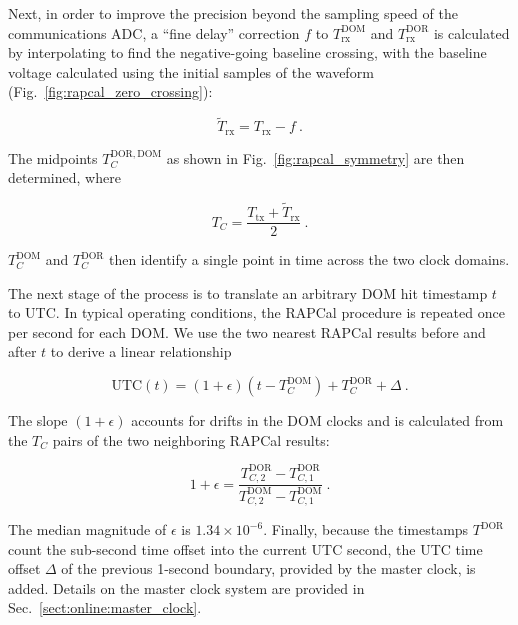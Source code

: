 Next, in order to improve the precision beyond the sampling speed of the
communications ADC, a ``fine delay'' correction $f$ to $T_{\mathrm{rx}}^{\mathrm{DOM}}$ and
$T_{\mathrm{rx}}^{\mathrm{DOR}}$ is calculated by interpolating 
to find the negative-going baseline crossing, with the baseline voltage
calculated using the initial samples of the waveform (Fig.~\ref{fig:rapcal_zero_crossing}):

\begin{equation}
  \tilde{T}_{\mathrm{rx}} = T_{\mathrm{rx}} - f\ .
\end{equation}


\noindent The midpoints $T_C^{\mathrm{DOR,DOM}}$ as shown in
Fig.~\ref{fig:rapcal_symmetry} are then determined, where

\begin{equation}
  T_C =  \frac{T_{\mathrm{tx}} + \tilde{T}_{\mathrm{rx}}}{2}\ .
\end{equation}

\noindent $T_C^{\mathrm{DOM}}$ and $T_C^{\mathrm{DOR}}$ then identify a
single point in time across the two clock domains.

The next stage of the process is to translate an arbitrary DOM hit timestamp
$t$ to UTC.  In typical operating conditions, the RAPCal procedure
is repeated once per second for each DOM.  We use the two nearest RAPCal
results before and after $t$ to derive a linear relationship

\begin{equation}
  \mathrm{UTC}(t) = (1+\epsilon)(t - T_C^{\mathrm{DOM}}) +
  T_C^{\mathrm{DOR}} + \Delta\ .
\end{equation}

\noindent The slope $(1+\epsilon)$ accounts for drifts in the DOM
clocks and is calculated from the $T_C$ pairs of the two neighboring RAPCal
results: 

\begin{equation}
  1+\epsilon = \frac{T_{C,2}^{\mathrm{DOR}} -
    T_{C,1}^{\mathrm{DOR}}}{T_{C,2}^{\mathrm{DOM}} -
    T_{C,1}^{\mathrm{DOM}}}\ .
\end{equation}

\noindent The median magnitude of $\epsilon$ is $1.34 \times 10^{-6}$.
Finally, because the timestamps $T^{\mathrm{DOR}}$ count the sub-second
time offset into the current UTC second, the UTC time offset $\Delta$ of the previous
1-second boundary, provided by the master clock, is added.  Details on the
master clock system are provided in Sec.~\ref{sect:online:master_clock}.

